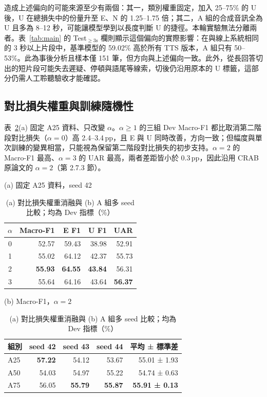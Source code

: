 造成上述偏向的可能來源至少有兩個：其一，類別權重固定，加入 25–75\% 的 U 後，U 在總損失中的份量升至 E、N 的 1.25–1.75 倍；其二，A 組的合成音訊全為 U 且多為 8–12 秒，可能讓模型學到以長度判斷 U 的捷徑。本輪實驗無法分離兩者。表~\ref{tab:main} 的 Test$_{\ge3\text{s}}$ 欄則顯示這個偏向的實際影響：在與線上系統相同的 3 秒以上片段中，基準模型的 59.02\% 高於所有 TTS 版本，A 組只有 50–53\%。此為事後分析且樣本僅 151 筆，但方向與上述偏向一致。此外，從長回答切出的短片段可能失去遲疑、停頓與語尾等線索，切後仍沿用原本的 U 標籤，這部分仍需人工聆聽驗收才能確認。

\subsection{對比損失權重與訓練隨機性}

表~\ref{tab:cl_seed}(a) 固定 A25 資料、只改變 $\alpha$。$\alpha\ge1$ 的三組 Dev Macro-F1 都比取消第二階段對比損失（$\alpha=0$）高 2.4–3.4\,pp，且 E 與 U 同時改善，方向一致；但幅度與單次訓練的變異相當，只能視為保留第二階段對比損失的初步支持。$\alpha=2$ 的 Macro-F1 最高、$\alpha=3$ 的 UAR 最高，兩者差距皆小於 0.3\,pp，因此沿用 CRAB 原論文的 $\alpha=2$（第 2.7.3 節）。

\begin{table}[t]
\centering
\caption{(a) 對比損失權重消融與 (b) A 組多 seed 比較；均為 Dev 指標（\%）}
\label{tab:cl_seed}
\small
\begin{minipage}[t]{0.43\textwidth}
\centering (a) 固定 A25 資料，seed 42\par\smallskip
\begin{tabular}{@{}crrrr@{}}
\toprule
$\alpha$ & Macro-F1 & E F1 & U F1 & UAR\\
\midrule
0 & 52.57 & 59.43 & 38.98 & 52.91\\
1 & 55.02 & 64.12 & 42.37 & 55.73\\
2 & \textbf{55.93} & \textbf{64.55} & \textbf{43.84} & 56.31\\
3 & 55.64 & 64.16 & 43.64 & \textbf{56.37}\\
\bottomrule
\end{tabular}
\end{minipage}\hfill
\begin{minipage}[t]{0.54\textwidth}
\centering (b) Macro-F1，$\alpha=2$\par\smallskip
\begin{tabular}{@{}lrrrr@{}}
\toprule
組別 & seed 42 & seed 43 & seed 44 & 平均 ± 標準差\\
\midrule
A25 & \textbf{57.22} & 54.12 & 53.67 & 55.01 ± 1.93\\
A50 & 54.03 & 54.97 & 55.22 & 54.74 ± 0.63\\
A75 & 56.05 & \textbf{55.79} & \textbf{55.87} & \textbf{55.91 ± 0.13}\\
\bottomrule
\end{tabular}
\end{minipage}
\end{table}

